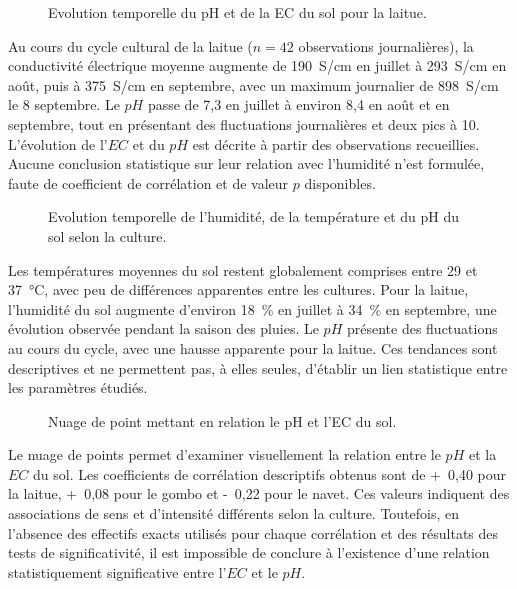\begin{figure}[H]
    \centering
    \caption{Evolution temporelle du pH et de la EC du sol pour la laitue. }
    \label{fig:ph-ec-evolution5}
\end{figure}
Au cours du cycle cultural de la laitue ($n = 42$ observations journalières), la conductivité électrique moyenne augmente de 190~\textmu S/cm en juillet à 293~\textmu S/cm en août, puis à 375~\textmu S/cm en septembre, avec un maximum journalier de 898~\textmu S/cm le 8 septembre. Le $pH$ passe de 7{,}3 en juillet à environ 8{,}4 en août et en septembre, tout en présentant des fluctuations journalières et deux pics à 10. L’évolution de l’$EC$ et du $pH$ est décrite à partir des observations recueillies. Aucune conclusion statistique sur leur relation avec l’humidité n’est formulée, faute de coefficient de corrélation et de valeur $p$ disponibles.

\begin{figure}[H]
    \centering
    \caption{Evolution temporelle de l'humidité, de la température et du pH du sol selon la culture. }
    \label{fig:ph-hum-temp5}
\end{figure}
Les températures moyennes du sol restent globalement comprises entre 29 et 37~°C, avec peu de différences apparentes entre les cultures. Pour la laitue, l’humidité du sol augmente d’environ 18~\% en juillet à 34~\% en septembre, une évolution observée pendant la saison des pluies. Le $pH$ présente des fluctuations au cours du cycle, avec une hausse apparente pour la laitue. Ces tendances sont descriptives et ne permettent pas, à elles seules, d’établir un lien statistique entre les paramètres étudiés.

\begin{figure}[H]
    \centering
    \caption{Nuage de point mettant en relation le pH et l’EC du sol. }
    \label{fig:ph-ec-nuage5}
\end{figure}
Le nuage de points permet d’examiner visuellement la relation entre le $pH$ et la $EC$ du sol. Les coefficients de corrélation descriptifs obtenus sont de +~0,40 pour la laitue, +~0,08 pour le gombo et -~0,22 pour le navet. Ces valeurs indiquent des associations de sens et d’intensité différents selon la culture. Toutefois, en l’absence des effectifs exacts utilisés pour chaque corrélation et des résultats des tests de significativité, il est impossible de conclure à l’existence d’une relation statistiquement significative entre l'$EC$ et le $pH$.

